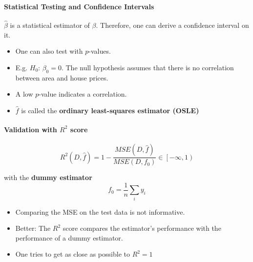 \paragraph{Statistical Testing and Confidence Intervals}


$\hat{\beta}$ is a statistical estimator of $\beta$. Therefore, one can derive a confidence interval on it.


\begin{itemize}
    \item One can also test with $p$-values.
    \item E.g. $H_0$: $\beta_0=0$. The null hypothesis assumes that there is no correlation between area and house prices.
    \item A low $p$-value indicates a correlation.
\end{itemize}


\begin{itemize}
    \item $\hat{f}$ is called the \textbf{ordinary least-squares estimator (OSLE)}
\end{itemize}

\paragraph[Validation with R2]{Validation with $R^2$ score}
\begin{equation*}
    R^2(D,\hat{f})=1-\frac{MSE(D,\hat{f})}{MSE(D,f_0)}\in\left[-\infty,1\right) %
\end{equation*}

with the \textbf{dummy estimator}
\begin{equation*}
    f_0=\frac1n\sum_{i}{y_i}
\end{equation*}


\begin{itemize}
    \item Comparing the MSE on the test data is not informative.
    \item Better: The $R^2$ score compares the estimator's performance with the performance of a dummy estimator.
    \item One tries to get as close as possible to $R^2=1$
\end{itemize}

